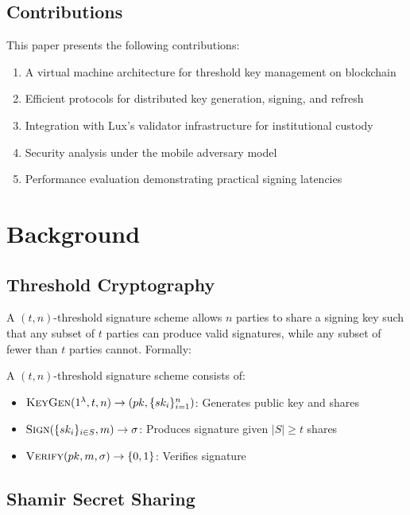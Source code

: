 \documentclass[11pt,twocolumn]{article}
\begin{document}
\subsection{Contributions}

This paper presents the following contributions:

\begin{enumerate}
\item A virtual machine architecture for threshold key management on blockchain
\item Efficient protocols for distributed key generation, signing, and refresh
\item Integration with Lux's validator infrastructure for institutional custody
\item Security analysis under the mobile adversary model
\item Performance evaluation demonstrating practical signing latencies
\end{enumerate}

\section{Background}

\subsection{Threshold Cryptography}

A $(t,n)$-threshold signature scheme allows $n$ parties to share a signing key such that any subset of $t$ parties can produce valid signatures, while any subset of fewer than $t$ parties cannot. Formally:

\begin{definition}
A $(t,n)$-threshold signature scheme consists of:
\begin{itemize}
\item $\textsc{KeyGen}(1^\lambda, t, n) \rightarrow (pk, \{sk_i\}_{i=1}^n)$: Generates public key and shares
\item $\textsc{Sign}(\{sk_i\}_{i \in S}, m) \rightarrow \sigma$: Produces signature given $|S| \geq t$ shares
\item $\textsc{Verify}(pk, m, \sigma) \rightarrow \{0,1\}$: Verifies signature
\end{itemize}
\end{definition}

\subsection{Shamir Secret Sharing}
\end{document}
